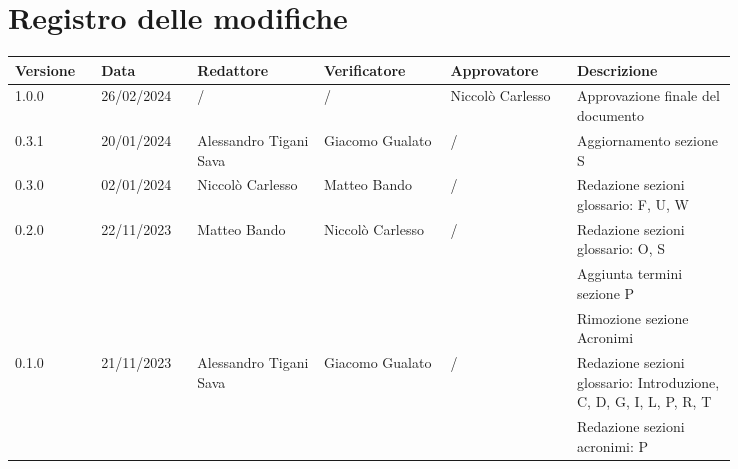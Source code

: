 \section*{Registro delle modifiche}
 {
  \renewcommand{\arraystretch}{1.5}
  \scriptsize
  \begin{longtable}{p{0.10\linewidth}p{0.10\linewidth}p{0.15\linewidth}p{0.15\linewidth}p{0.15\linewidth}p{0.19\linewidth}}
	  \textbf{Versione} & \textbf{Data} & \textbf{Redattore}     & \textbf{Verificatore} & \textbf{Approvatore} & \textbf{Descrizione}                                              \\
	  \toprule
	  1.0.0             & 26/02/2024    & /                      & /                     & Niccolò Carlesso     & Approvazione finale del documento                                 \\
	  \hline
	  0.3.1             & 20/01/2024    & Alessandro Tigani Sava & Giacomo Gualato       & /                    & Aggiornamento sezione S                                           \\
	  \hline
	  0.3.0             & 02/01/2024    & Niccolò Carlesso       & Matteo Bando          & /                    & Redazione sezioni glossario: F, U, W                              \\
	  \hline
	  0.2.0             & 22/11/2023    & Matteo Bando           & Niccolò Carlesso      & /                    & Redazione sezioni glossario: O, S                                 \\
	                    &               &                        &                       &                      & Aggiunta termini sezione P                                        \\
	                    &               &                        &                       &                      & Rimozione sezione Acronimi                                        \\
	  \hline
	  0.1.0             & 21/11/2023    & Alessandro Tigani Sava & Giacomo Gualato       & /                    & Redazione sezioni glossario: Introduzione, C, D, G, I, L, P, R, T \\
	                    &               &                        &                       &                      & Redazione sezioni acronimi: P                                     \\
	  \bottomrule
  \end{longtable}
 }
